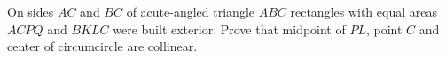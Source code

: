 On sides $AC$ and $BC$ of acute-angled triangle $ABC$ rectangles with equal areas $ACPQ$ and $BKLC$ were built exterior. Prove that midpoint of $PL$, point $C$ and center of circumcircle are collinear.